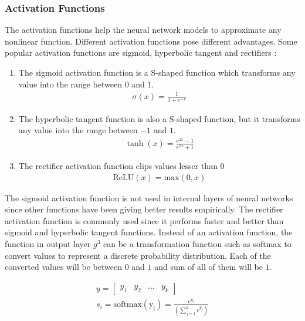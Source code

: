 \documentclass[a4paper, 11pt]{article}
\begin{document}
\subsubsection{Activation Functions}

The activation functions help the neural network models to approximate any nonlinear function. Different activation functions pose different advantages. Some popular activation functions are sigmoid, hyperbolic tangent and rectifiers \parencite{Goldberg2016}:

\begin{enumerate}

\item The sigmoid activation function is a S-shaped function which transforms any value into the range between $0$ and $1$.  
\begin{align*}
\sigma (x) = \frac{1}{1 + e^{-x}}
\end{align*}

\item The hyperbolic tangent function is also a S-shaped function, but it transforms any value into the range between $-1$ and $1$.
\begin{align*}
\tanh (x) = \frac{e^{2x}-1}{e^{2x}+1}
\end{align*}

\item The rectifier activation function clips values lesser than $0$
\begin{align*}
\mathrm{ReLU}(x) = \mathrm{max}(0,x)
\end{align*}

\end{enumerate}

The sigmoid activation function is not used in internal layers of neural networks since other functions have been giving better results empirically. The rectifier activation function is commonly used since it performs faster and better than sigmoid and hyperbolic tangent functions. Instead of an activation function, the function in output layer $g^3$ can be a transformation function such as softmax to convert values to represent a discrete probability distribution. Each of the converted values will be between $0$ and $1$ and sum of all of them will be $1$.

\begin{align*}
y = \begin{bmatrix} y_1 & y_2 & \dots & y_k \end{bmatrix} \\
s_i = \mathrm{softmax(y_i)} = \frac{e^{y_i}}{(\sum_{j=1}^ke^{y_j})}
\end{align*}
\end{document}
